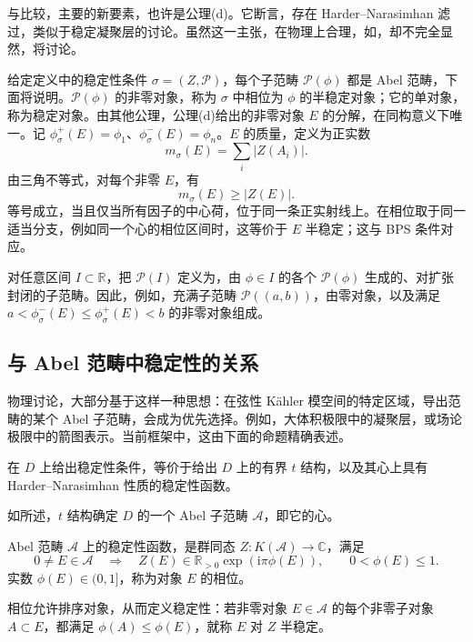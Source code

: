 与比较，主要的新要素，也许是公理(d)。它断言，存在 Harder--Narasimhan 滤过，类似于稳定凝聚层的讨论。虽然这一主张，在物理上合理，如，却不完全显然，将讨论。

给定定义中的稳定性条件 $\sigma=(Z,\mathcal{P})$，每个子范畴 $\mathcal{P}(\phi)$ 都是 Abel 范畴，下面将说明。$\mathcal{P}(\phi)$ 的非零对象，称为 $\sigma$ 中相位为 $\phi$ 的半稳定对象；它的单对象，称为稳定对象。由其他公理，公理(d)给出的非零对象 $E$ 的分解，在同构意义下唯一。记 $\phi_\sigma^+(E)=\phi_1$、$\phi_\sigma^-(E)=\phi_n$。$E$ 的质量，定义为正实数
\[
m_\sigma(E)=\sum_i|Z(A_i)|.
\]
由三角不等式，对每个非零 $E$，有
\[
m_\sigma(E)\ge|Z(E)|.
\]
等号成立，当且仅当所有因子的中心荷，位于同一条正实射线上。在相位取于同一适当分支，例如同一个心的相位区间时，这等价于 $E$ 半稳定；这与 BPS 条件对应。

对任意区间 $I\subset\mathbb{R}$，把 $\mathcal{P}(I)$ 定义为，由 $\phi\in I$ 的各个 $\mathcal{P}(\phi)$ 生成的、对扩张封闭的子范畴。因此，例如，充满子范畴 $\mathcal{P}((a,b))$，由零对象，以及满足 $a<\phi_\sigma^-(E)\le\phi_\sigma^+(E)<b$ 的非零对象组成。

\subsection{与 Abel 范畴中稳定性的关系}\label{sec:5.7.1}

物理讨论，大部分基于这样一种思想：在弦性 K\"ahler 模空间的特定区域，导出范畴的某个 Abel 子范畴，会成为优先选择。例如，大体积极限中的凝聚层，或场论极限中的箭图表示。当前框架中，这由下面的命题精确表述。
\begin{proposition}\label{prop:5.35}
在 $D$ 上给出稳定性条件，等价于给出 $D$ 上的有界 $t$ 结构，以及其心上具有 Harder--Narasimhan 性质的稳定性函数。
\end{proposition}

如所述，$t$ 结构确定 $D$ 的一个 Abel 子范畴 $\mathcal{A}$，即它的心。
\begin{definition*}[稳定性函数]
Abel 范畴 $\mathcal{A}$ 上的稳定性函数，是群同态 $Z\colon K(\mathcal{A})\to\mathbb{C}$，满足
\[
0\ne E\in\mathcal{A}\quad\Longrightarrow\quad
Z(E)\in\mathbb{R}_{>0}\exp(\mathrm{i}\pi\phi(E)),
\qquad 0<\phi(E)\le1.
\]
实数 $\phi(E)\in(0,1]$，称为对象 $E$ 的相位。
\end{definition*}
相位允许排序对象，从而定义稳定性：若非零对象 $E\in\mathcal{A}$ 的每个非零子对象 $A\subset E$，都满足 $\phi(A)\le\phi(E)$，就称 $E$ 对 $Z$ 半稳定。

